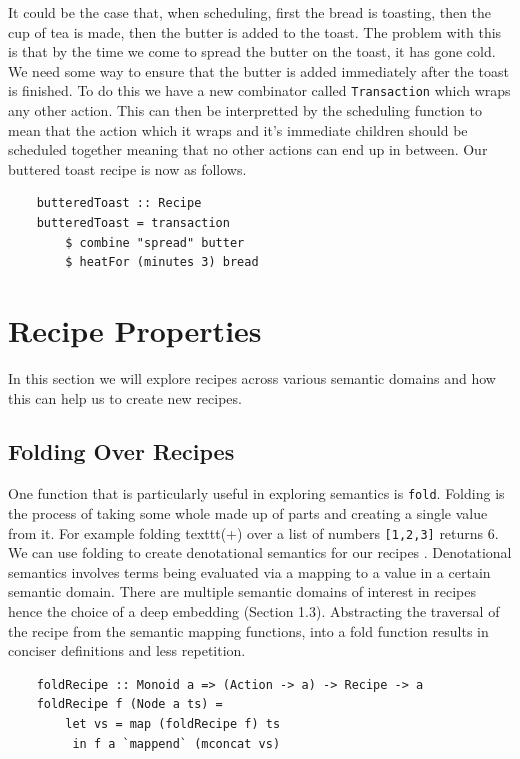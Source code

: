 \documentclass[11pt]{article}
\begin{document}
It could be the case that, when scheduling, first the bread is toasting, then the cup of tea is
made, then the butter is added to the toast. The problem with this is that by the time we come
to spread the butter on the toast, it has gone cold. We need some way to ensure that the butter
is added immediately after the toast is finished. To do this we have a new combinator called
\texttt{Transaction} which wraps any other action. This can then be interpretted by the scheduling
function to mean that the action which it wraps and it's immediate children should be scheduled
together meaning that no other actions can end up in between. Our buttered toast recipe is now
as follows.

\begin{lstlisting}
    butteredToast :: Recipe
    butteredToast = transaction
        $ combine "spread" butter
        $ heatFor (minutes 3) bread
\end{lstlisting}

\section{Recipe Properties}

In this section we will explore recipes across various semantic domains and how this can
help us to create new recipes.

\subsection{Folding Over Recipes}

One function that is particularly useful in exploring semantics is \texttt{fold}.
Folding is the process of taking some whole made up of parts and creating a single
value from it. For example folding texttt{(+)} over a list of numbers \texttt{[1,2,3]}
returns 6. We can use folding to create denotational semantics for our recipes \cite{hutton}.
Denotational semantics involves terms being evaluated via a mapping to a value in a certain
semantic domain. There are multiple semantic domains of interest in recipes hence the choice
of a deep embedding (Section 1.3). Abstracting the traversal of the recipe from the
semantic mapping functions, into a fold function results in conciser definitions and
less repetition.

\begin{lstlisting}
    foldRecipe :: Monoid a => (Action -> a) -> Recipe -> a
    foldRecipe f (Node a ts) =
        let vs = map (foldRecipe f) ts
         in f a `mappend` (mconcat vs)
\end{lstlisting}
\end{document}
